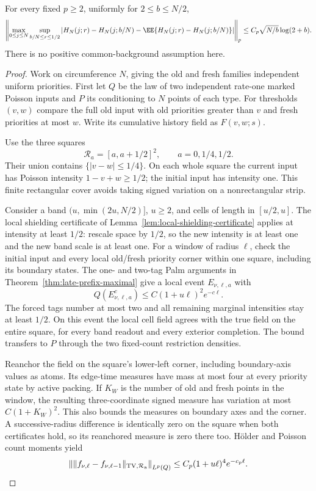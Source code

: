 \documentclass[11pt,letterpaper]{article}
\begin{document}
\begin{lemma}
\label{lem:dense-late-prefix}
For every fixed $p\ge2$, uniformly for $2\le b\le N/2$,
\begin{equation}\label{eq:dense-late-prefix}
 \left\|\max_{0\le j\le N}\sup_{b/N\le r\le1/2}
   \left|H_N(j;r)-H_N(j;b/N)
           -\EE\{H_N(j;r)-H_N(j;b/N)\}\right|\right\|_p
        \le C_p\sqrt{N/b}\log(2+b).
\end{equation}
There is no positive common-background assumption here.
\end{lemma}
\begin{proof}
Work on circumference $N$, giving the old and fresh
families independent uniform priorities. First let $Q$
be the law of two independent rate-one marked Poisson
inputs and $P$ its conditioning to $N$ points of each type.
For thresholds $(v,w)$ compare the full old input with
old priorities greater than $v$ and fresh priorities at
most $w$. Write its cumulative history field as $F(v,w;s)$.

Use the three squares
\[
 \mathcal R_a=[a,a+1/2]^2,\qquad a=0,1/4,1/2.
\]
Their union contains $\{|v-w|\le1/4\}$.
On each whole square the current input has Poisson
intensity $1-v+w\ge1/2$; the initial input has intensity one.
This finite rectangular cover avoids taking signed
variation on a nonrectangular strip.

Consider a band $(u,\min(2u,N/2)]$, $u\ge2$, and cells
of length in $[u/2,u]$.
The local shielding certificate of
Lemma~\ref{lem:local-shielding-certificate} applies at
intensity at least $1/2$: rescale space by $1/2$, so the
new intensity is at least one and the new band scale is
at least one. For a window of radius $\ell$, check the
initial input and every local old/fresh priority corner
within one square, including its boundary states.
The one- and two-tag Palm arguments in
Theorem~\ref{thm:late-prefix-maximal} give a local event
$E_{\nu,\ell,a}$ with
\[
 Q(E_{\nu,\ell,a}^c)
                  \le C(1+u\ell)^2e^{-c\ell}.
\]
The forced tags number at most two and all remaining
marginal intensities stay at least $1/2$.
On this event the local cell field agrees with the true
field on the entire square, for every band readout and
every exterior completion.
The bound transfers to $P$ through the two fixed-count
restriction densities.

Reanchor the field on the square's lower-left corner,
including boundary-axis values as atoms.
Its edge-time measures have mass at most four at every
priority state by active packing. If $K_W$ is the number
of old and fresh points in the window, the resulting
three-coordinate signed measure has variation at most
$C(1+K_W)^2$. This also bounds the measures on boundary
axes and the corner. A successive-radius difference is
identically zero on the square when both certificates
hold, so its reanchored measure is zero there too.
H\"older and Poisson count moments yield
\[
 \left\|\|f_{\nu,\ell}-f_{\nu,\ell-1}\|_{\rm TV,\mathcal R_a}
                                                 \right\|_{L^p(Q)}
                \le C_p(1+u\ell)^4e^{-c_p\ell}.
\]


\end{proof}
\end{document}

